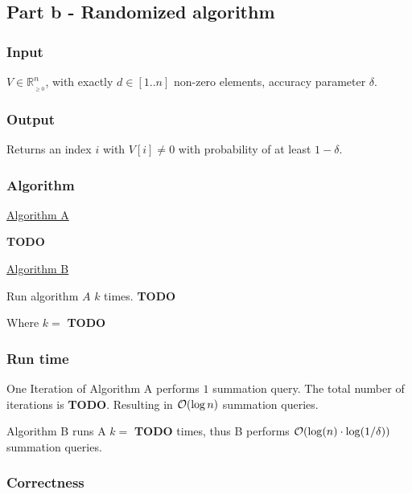 \subsection*{Part b - Randomized algorithm}

\subsubsection*{Input}

$V \in \mathbb{R}_{_{\geq 0}}^n$, with exactly $d \in [1..n]$ non-zero elements, accuracy parameter $\delta$.

\subsubsection*{Output}

Returns an index $i$ with $V[i] \neq 0$ with probability of at least $1 - \delta$.

\subsubsection*{Algorithm}

\underline{Algorithm A}

\textbf{TODO}

\underline{Algorithm B}

Run algorithm $A$ $k$ times. \textbf{TODO}

Where $k = $ \textbf{TODO}

\subsubsection*{Run time}

One Iteration of Algorithm A performs $1$ summation query. The total number of iterations is \textbf{TODO}.
Resulting in $\mathcal{O}(\log n)$ summation queries. 

Algorithm B runs A $k = $ \textbf{TODO} times, thus B performs $\mathcal{O}(\log(n)\cdot\log(1/\delta))$ summation queries.

\subsubsection*{Correctness}